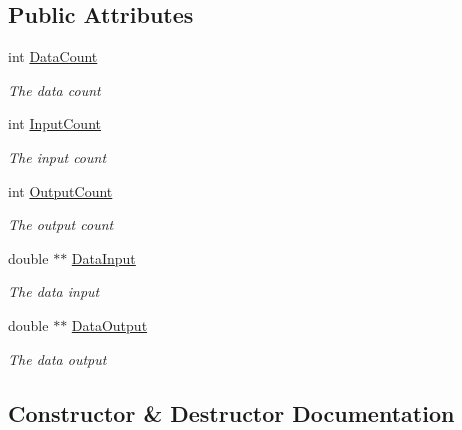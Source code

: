 \subsection*{Public Attributes}
\begin{DoxyCompactItemize}
\item 
int \hyperlink{class_n_n_t_lib_1_1_data_container_aa90b71e48e7eb8ff3fe9f42bd4c57071}{Data\+Count}
\begin{DoxyCompactList}\small\item\em The data count \end{DoxyCompactList}\item 
int \hyperlink{class_n_n_t_lib_1_1_data_container_a4929c69fbf3ac00f7bbd277414aac54e}{Input\+Count}
\begin{DoxyCompactList}\small\item\em The input count \end{DoxyCompactList}\item 
int \hyperlink{class_n_n_t_lib_1_1_data_container_a821ff2aaddaf2bd392f0741b5f33799c}{Output\+Count}
\begin{DoxyCompactList}\small\item\em The output count \end{DoxyCompactList}\item 
double $\ast$$\ast$ \hyperlink{class_n_n_t_lib_1_1_data_container_a15c14ea2246df3d12cfaf5fe822d479a}{Data\+Input}
\begin{DoxyCompactList}\small\item\em The data input \end{DoxyCompactList}\item 
double $\ast$$\ast$ \hyperlink{class_n_n_t_lib_1_1_data_container_adcbb3f80557abf9f8fb8f53ea648a3ad}{Data\+Output}
\begin{DoxyCompactList}\small\item\em The data output \end{DoxyCompactList}\end{DoxyCompactItemize}


\subsection{Constructor \& Destructor Documentation}
\hypertarget{class_n_n_t_lib_1_1_data_container_a3e3a40faa67e7695f3ccc9e564c9ff40}{}
